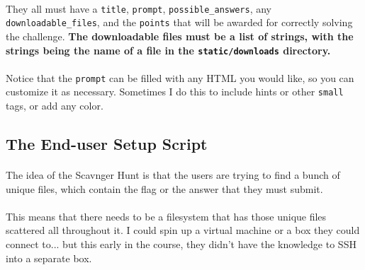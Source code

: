 \documentclass[11pt]{article}
\begin{document}
	\paragraph{} They all must have a \texttt{title}, \texttt{prompt}, \texttt{possible\_answers}, any \texttt{downloadable\_files}, and the \texttt{points} that will be awarded for correctly solving the challenge. \textbf{The downloadable files must be a list of strings, with the strings being the name of a file in the \texttt{static/downloads} directory. }

	\paragraph{} Notice that the \texttt{prompt} can be filled with any HTML you would like, so you can customize it as necessary. Sometimes I do this to include hints or other \texttt{small} tags, or add any color. 

	\paragraph{}


	\begin{center}
		\graphicspath{ {.} }
		\centering
	\end{center}

	\newpage

	\subsection{The End-user Setup Script}

	\paragraph{} The idea of the Scavnger Hunt is that the users are trying to find a bunch of unique files, which contain the flag or the answer that they must submit.

	\paragraph{} This means that there needs to be a filesystem that has those unique files scattered all throughout it. I could spin up a virtual machine or a box they could connect to... but this early in the course, they didn't have the knowledge to SSH into a separate box.
\end{document}
